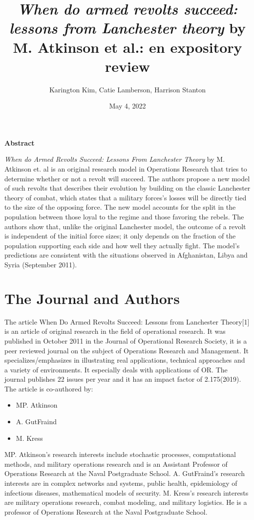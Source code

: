 \documentclass{article}
\title{\textit{When do armed revolts succeed: lessons from Lanchester theory} by M. Atkinson et al.: en expository review}
\author{Karington Kim, Catie Lamberson, Harrison Stanton}
\date{May 4, 2022}
\begin{document}
\maketitle

\begin{center}
\bf{Abstract}
\end{center}
\textit{When do Armed Revolts Succeed: Lessons From Lanchester Theory} by M. Atkinson et. al is an original research model in Operations Research that tries to determine whether or not a revolt will succeed. The authors propose a new model of such revolts that describes their evolution by building on the classic Lanchester theory of combat, which states that a military forces’s losses will be directly tied to the size of the opposing force. The new model accounts for the split in the population between those loyal to the regime and those favoring the rebels. The authors show that, unlike the original Lanchester model, the outcome of a revolt is independent of the initial force sizes; it only depends on the fraction of the population supporting each side and how well they actually fight. The model's predictions are consistent with the situations observed in Afghanistan, Libya and Syria (September 2011).


\section{The Journal and Authors}
The article When Do Armed Revolts Succeed: Lessons from Lanchester Theory[1] is an article of original research in the field of operational research. It was published in October 2011 in the Journal of Operational Research Society, it is a peer reviewed journal on the subject of Operations Research and Management. It specializes/emphasizes in illustrating real applications, technical approaches and a variety of environments. It especially deals with applications of OR. The journal publishes 22 issues per year and it has an impact factor of 2.175(2019). The article is co-authored by:
\begin{itemize}
    \item MP. Atkinson
    \item A. GutFraind
    \item M. Kress
\end{itemize}
MP. Atkinson’s research interests include stochastic processes, computational methods, and military operations research and is an Assistant Professor of Operations Research at the Naval Postgraduate School. 
A. GutFraind’s research interests are in complex networks and systems, public health, epidemiology of infectious diseases, mathematical models of security.
M. Kress’s research interests are military operations research, combat modeling, and military logistics. He is a professor of Operations Research at the Naval Postgraduate School.
\end{document}
